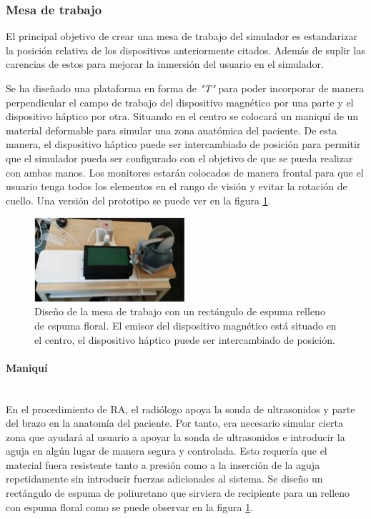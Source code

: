 \subsubsection{Mesa de trabajo}

El principal objetivo de crear una mesa de trabajo del simulador es estandarizar la posición relativa de los dispositivos anteriormente citados. Además de suplir las carencias de estos para mejorar la inmersión del usuario en el simulador.

Se ha diseñado una plataforma en forma de \emph{"T"}  para poder incorporar de manera perpendicular el campo de trabajo del dispositivo magnético por una parte y el dispositivo háptico por otra. Situando en el centro se colocará un maniquí de un material deformable para simular una zona anatómica del paciente. De esta manera, el dispositivo háptico puede ser intercambiado de posición para permitir que el simulador pueda ser configurado con el objetivo de que se pueda realizar con ambas manos. 
Los monitores estarán colocados de manera frontal para que el usuario tenga todos los elementos en el rango de visión y evitar la rotación de cuello. Una versión del prototipo se puede ver en la figura \ref{fig:simulator}.


\begin{figure}[h]
    \centering
    \includegraphics[width=0.5\textwidth]{IMG/simulator.PNG}
    \caption{Diseño de la mesa de trabajo con un rectángulo de espuma relleno de espuma floral. El emisor del dispositivo magnético está situado en el centro, el dispositivo háptico puede ser intercambiado de posición.}
    \label{fig:simulator}
\end{figure}


\paragraph{Maniquí} \mbox{}\\
En el procedimiento de \ac{RA}, el radiólogo apoya la sonda de ultrasonidos y parte del brazo en la anatomía del paciente. Por tanto, era necesario simular cierta zona que ayudará al usuario a apoyar la sonda de ultrasonidos e introducir la aguja en algún lugar de manera segura y controlada. Esto requería que el material fuera resistente tanto a presión como a la inserción de la aguja repetidamente sin introducir fuerzas adicionales al sistema. Se diseño un rectángulo de espuma de poliuretano que sirviera de recipiente para un relleno con espuma floral como se puede observar en la figura \ref{fig:simulator}.


